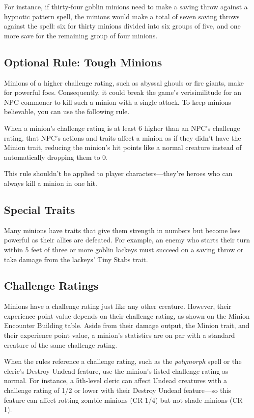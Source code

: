 \documentclass[10pt,a4paper,twoside,bg=print,twocolumn,openany,nodeprecatedcode]{dndbook}
\begin{document}
For instance, if thirty-four goblin minions need to make a saving throw against a hypnotic pattern spell, the minions would make a total of seven saving throws against the spell: six for thirty minions divided into six groups of five, and one more save for the remaining group of four minions.

\subsection{Optional Rule: Tough Minions}
Minions of a higher challenge rating, such as abyssal ghouls or fire giants, make for powerful foes. Consequently, it could break the game's verisimilitude for an NPC commoner to kill such a minion with a single attack. To keep minions believable, you can use the following rule.

When a minion's challenge rating is at least 6 higher than an NPC's challenge rating, that NPC's actions and traits affect a minion as if they didn't have the Minion trait, reducing the minion's hit points like a normal creature instead of automatically dropping them to 0.

This rule shouldn't be applied to player characters—they're heroes who can always kill a minion in one hit.

\subsection{Special Traits}
Many minions have traits that give them strength in numbers but become less powerful as their allies are defeated. For example, an enemy who starts their turn within 5 feet of three or more goblin lackeys must succeed on a saving throw or take damage from the lackeys' Tiny Stabs trait.

\subsection{Challenge Ratings}
Minions have a challenge rating just like any other creature. However, their experience point value depends on their challenge rating, as shown on the Minion Encounter Building table. Aside from their damage output, the Minion trait, and their experience point value, a minion's statistics are on par with a standard creature of the same challenge rating.

When the rules reference a challenge rating, such as the \textit{polymorph} spell or the cleric's Destroy Undead feature, use the minion's listed challenge rating as normal. For instance, a 5th-level cleric can affect Undead creatures with a challenge rating of 1/2 or lower with their Destroy Undead feature—so this feature can affect rotting zombie minions (CR 1/4) but not shade minions (CR 1).
\end{document}

